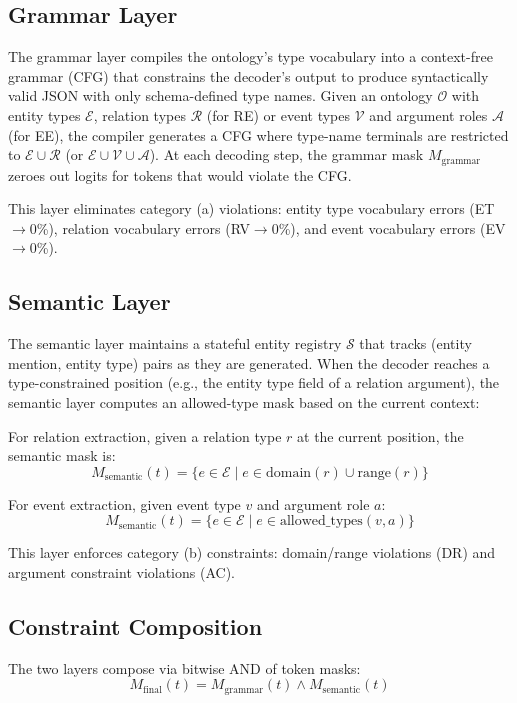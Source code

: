 \documentclass[11pt,a4paper]{article}
\begin{document}
\subsection{Grammar Layer}

The grammar layer compiles the ontology's type vocabulary into a context-free grammar (CFG) that constrains the decoder's output to produce syntactically valid JSON with only schema-defined type names. Given an ontology $\mathcal{O}$ with entity types $\mathcal{E}$, relation types $\mathcal{R}$ (for RE) or event types $\mathcal{V}$ and argument roles $\mathcal{A}$ (for EE), the compiler generates a CFG where type-name terminals are restricted to $\mathcal{E} \cup \mathcal{R}$ (or $\mathcal{E} \cup \mathcal{V} \cup \mathcal{A}$). At each decoding step, the grammar mask $M_{\text{grammar}}$ zeroes out logits for tokens that would violate the CFG.

This layer eliminates category (a) violations: entity type vocabulary errors (ET$\to$0\%), relation vocabulary errors (RV$\to$0\%), and event vocabulary errors (EV$\to$0\%).

\subsection{Semantic Layer}

The semantic layer maintains a stateful entity registry $\mathcal{S}$ that tracks (entity mention, entity type) pairs as they are generated. When the decoder reaches a type-constrained position (e.g., the entity type field of a relation argument), the semantic layer computes an allowed-type mask based on the current context:

For relation extraction, given a relation type $r$ at the current position, the semantic mask is:
\[
M_{\text{semantic}}(t) = \{e \in \mathcal{E} \mid e \in \text{domain}(r) \cup \text{range}(r)\}
\]

For event extraction, given event type $v$ and argument role $a$:
\[
M_{\text{semantic}}(t) = \{e \in \mathcal{E} \mid e \in \text{allowed\_types}(v, a)\}
\]

This layer enforces category (b) constraints: domain/range violations (DR) and argument constraint violations (AC).

\subsection{Constraint Composition}

The two layers compose via bitwise AND of token masks:
\[
M_{\text{final}}(t) = M_{\text{grammar}}(t) \wedge M_{\text{semantic}}(t)
\]
\end{document}

